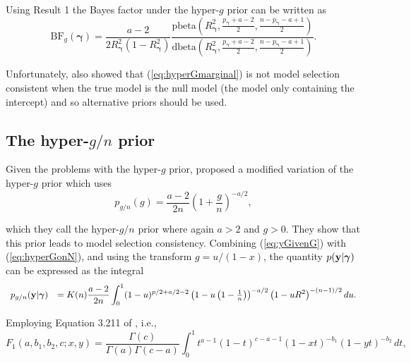 \documentclass[12pt]{article}
\def\vectorfontone{\bf}
\def\vectorfonttwo{\boldsymbol}
\def\vy{{\vectorfontone y}}                      %
\def\vgamma{{\vectorfonttwo \gamma}}             %
\def\ds{\displaystyle}
\begin{document}
\noindent Using Result 1 the Bayes factor under the hyper-$g$ prior can be written as
\begin{equation}\label{eq:hyperGmarginal2}
	\ds \mbox{BF}_{g}(\vgamma) 
	=  
	\frac{a - 2}{2 R_\vgamma^2(1 - R_\vgamma^2)} 
	\frac{\mbox{pbeta}\left(R_\vgamma^2,\tfrac{p_\vgamma + a - 2}{2},\tfrac{n-p_\vgamma - a+1}{2}\right)}{
		\mbox{dbeta}\left(R_\vgamma^2,\tfrac{p_\vgamma + a - 2}{2},\tfrac{n-p_\vgamma - a+1}{2}\right)}.
\end{equation}


\noindent 
Unfortunately, \cite{Liang2008} also showed that
(\ref{eq:hyperGmarginal}) is not model selection consistent when the
true model is the null model (the model only containing the intercept) and so alternative priors should be used.




\subsection{The hyper-$g/n$ prior}

Given the problems with the hyper-$g$ prior, \cite{Liang2008} 
proposed a modified variation of the hyper-$g$ prior which uses
\begin{equation}\label{eq:hyperGonN}
\ds p_{g/n}(g) = \frac{a - 2}{2n}\left( 1 + \frac{g}{n} \right)^{-a/2},
\end{equation}

\noindent which they call the hyper-$g/n$ prior where again $a>2$ and $g>0$.
They show that this prior leads to model selection consistency.
Combining (\ref{eq:yGivenG}) with (\ref{eq:hyperGonN}), and using the transform
$g = u/(1 - x)$, the quantity $p(\vy|\vgamma)$ 
can be expressed as the integral
\begin{equation}\label{eq:hyperGonNmarginalIntegral}
\begin{array}{rl}
p_{g/n}(\vy|\vgamma) 
& \ds = K(n) \frac{a - 2}{2n}  \int_0^1 
(1 - u)^{p/2 + a/2 - 2  } \left(  1 - u \left(1  -  \tfrac{1}{n} \right) \right)^{-a/2} \left(  1 - u R^2\right)^{-(n-1)/2} du.
\end{array} 
\end{equation}

\noindent  Employing 
Equation 3.211 of \cite{Gradshteyn2007}, i.e.,
$$
F_1(a,b_1,b_2,c; x,y) = \frac{\Gamma(c)} {\Gamma(a)\Gamma(c-a)} 
\int_0^1 t^{a-1} (1-t)^{c-a-1} (1-xt)^{-b_1} (1-yt)^{-b_2} \, dt,
$$
\end{document}
